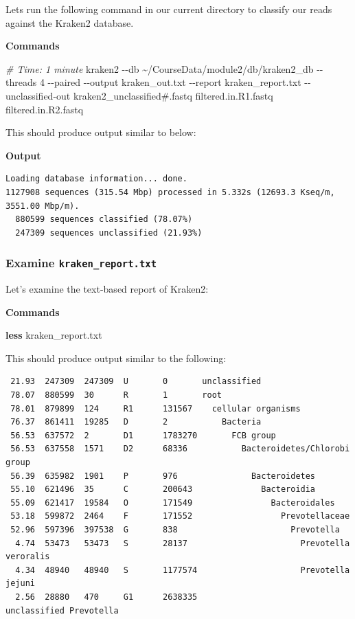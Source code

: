 \documentclass[
]{book}
\newenvironment{Shaded}{\begin{snugshade}}{\end{snugshade}}
\newcommand{\AttributeTok}[1]{\textcolor[rgb]{0.13,0.29,0.53}{#1}}
\newcommand{\CommentTok}[1]{\textcolor[rgb]{0.56,0.35,0.01}{\textit{#1}}}
\newcommand{\ExtensionTok}[1]{#1}
\newcommand{\FunctionTok}[1]{\textcolor[rgb]{0.13,0.29,0.53}{\textbf{#1}}}
\newcommand{\NormalTok}[1]{#1}
\begin{document}
Lets run the following command in our current directory to classify our reads against the Kraken2 database.

\textbf{Commands}

\begin{Shaded}
\begin{Highlighting}[]
\CommentTok{\# Time: 1 minute}
\ExtensionTok{kraken2} \AttributeTok{{-}{-}db}\NormalTok{ \textasciitilde{}/CourseData/module2/db/kraken2\_db }\AttributeTok{{-}{-}threads}\NormalTok{ 4 }\AttributeTok{{-}{-}paired} \AttributeTok{{-}{-}output}\NormalTok{ kraken\_out.txt }\AttributeTok{{-}{-}report}\NormalTok{ kraken\_report.txt }\AttributeTok{{-}{-}unclassified{-}out}\NormalTok{ kraken2\_unclassified\#.fastq filtered.in.R1.fastq filtered.in.R2.fastq}
\end{Highlighting}
\end{Shaded}

This should produce output similar to below:

\textbf{Output}

\begin{verbatim}
Loading database information... done.
1127908 sequences (315.54 Mbp) processed in 5.332s (12693.3 Kseq/m, 3551.00 Mbp/m).
  880599 sequences classified (78.07%)
  247309 sequences unclassified (21.93%)
\end{verbatim}

\subsubsection{\texorpdfstring{Examine \texttt{kraken\_report.txt}}{Examine kraken\_report.txt}}\label{examine-kraken_report.txt}

Let's examine the text-based report of Kraken2:

\textbf{Commands}

\begin{Shaded}
\begin{Highlighting}[]
\FunctionTok{less}\NormalTok{ kraken\_report.txt}
\end{Highlighting}
\end{Shaded}

This should produce output similar to the following:

\begin{verbatim}
 21.93  247309  247309  U       0       unclassified
 78.07  880599  30      R       1       root
 78.01  879899  124     R1      131567    cellular organisms
 76.37  861411  19285   D       2           Bacteria
 56.53  637572  2       D1      1783270       FCB group
 56.53  637558  1571    D2      68336           Bacteroidetes/Chlorobi group
 56.39  635982  1901    P       976               Bacteroidetes
 55.10  621496  35      C       200643              Bacteroidia
 55.09  621417  19584   O       171549                Bacteroidales
 53.18  599872  2464    F       171552                  Prevotellaceae
 52.96  597396  397538  G       838                       Prevotella
  4.74  53473   53473   S       28137                       Prevotella veroralis
  4.34  48940   48940   S       1177574                     Prevotella jejuni
  2.56  28880   470     G1      2638335                     unclassified Prevotella
\end{verbatim}
\end{document}
